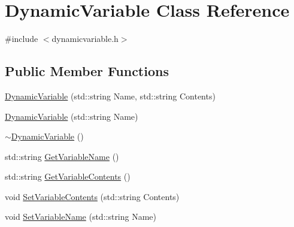\hypertarget{classDynamicVariable}{\section{Dynamic\-Variable Class Reference}
\label{classDynamicVariable}
}


{\ttfamily \#include $<$dynamicvariable.\-h$>$}

\subsection*{Public Member Functions}
\begin{DoxyCompactItemize}
\item 
\hyperlink{classDynamicVariable_a8e38eae3957a9898e185b39890d836b9}{Dynamic\-Variable} (std\-::string Name, std\-::string Contents)
\item 
\hyperlink{classDynamicVariable_a4c373222540fc9afb4f60c3cd5c3083c}{Dynamic\-Variable} (std\-::string Name)
\item 
\hyperlink{classDynamicVariable_af8f8237d328007c2fd13eeaf458e5bdb}{$\sim$\-Dynamic\-Variable} ()
\item 
std\-::string \hyperlink{classDynamicVariable_ae693b792fcc5aa86a12fe7d0316536c4}{Get\-Variable\-Name} ()
\item 
std\-::string \hyperlink{classDynamicVariable_a55d8bc325247917dbc35d0eb6127a818}{Get\-Variable\-Contents} ()
\item 
void \hyperlink{classDynamicVariable_a5073b6d461882be7b83e7eff0618442c}{Set\-Variable\-Contents} (std\-::string Contents)
\item 
void \hyperlink{classDynamicVariable_a3f56edd55dd554b8cf822b2d6c16be7f}{Set\-Variable\-Name} (std\-::string Name)
\end{DoxyCompactItemize}


